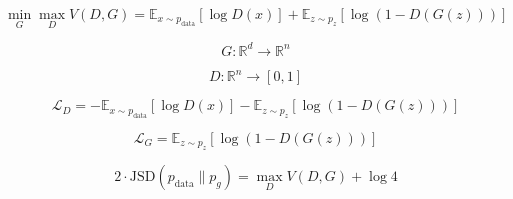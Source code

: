 
\begin{equation}
\min_G \max_D V(D,G) =
\mathbb{E}_{x\sim p_{\text{data}}}[\log D(x)]
+
\mathbb{E}_{z\sim p_z}[\log(1-D(G(z)))]
\end{equation}

\begin{equation}
G: \mathbb{R}^d \rightarrow \mathbb{R}^n
\end{equation}

\begin{equation}
D: \mathbb{R}^n \rightarrow [0,1]
\end{equation}

\begin{equation}
\mathcal{L}_D = -\mathbb{E}_{x\sim p_{\text{data}}}[\log D(x)]
-\mathbb{E}_{z\sim p_z}[\log(1-D(G(z)))]
\end{equation}

\begin{equation}
\mathcal{L}_G = \mathbb{E}_{z\sim p_z}[\log(1-D(G(z)))]
\end{equation}

\begin{equation}
2 \cdot \text{JSD}(p_{\text{data}} \parallel p_g) =
\max_D V(D,G) + \log 4
\end{equation}